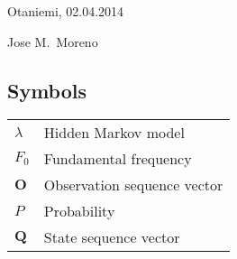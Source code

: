 \documentclass[english,12pt,a4paper,pdftex]{article}
\begin{document}
\vspace{1.5cm}
Otaniemi, 02.04.2014

\vspace{15mm}
{Jose M.\ Moreno \hspace{1cm}}

\newpage

\thesistableofcontents

\newpage
\listoffigures

\newpage
\listoftables

\subsection*{Symbols}
\begin{tabular}{l l}
	$\lambda$		& Hidden Markov model\\
	$F_{0}$		& Fundamental frequency\\
	$\mathbf{O}$	& Observation sequence vector\\
	$P$			 	& Probability\\
	$\mathbf{Q}$	& State sequence vector
\end{tabular}
\end{document}

